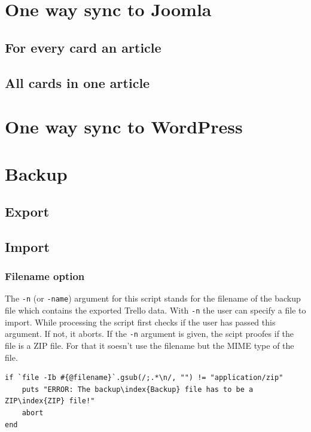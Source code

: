 \section{One way sync to Joomla}

\subsection{For every card an article}

\subsection{All cards in one article}

\section{One way sync to WordPress}

\section{Backup}

\subsection{Export}

\subsection{Import}

\subsubsection{Filename option}
The \texttt{-n} (or \texttt{-name}) argument for this script stands for the filename of the backup file which contains the  exported Trello data. With \texttt{-n} the user can specify a file to import. While processing the script first checks if the user has passed this argument. If not, it aborts. If the \texttt{-n} argument is given, the scipt proofes if the file is a ZIP file. For that it soesn't use the filename but the MIME type of the file.

\begin{lstlisting}[float=htb, caption=Checking if the file has the MIME type \textquotedblleft application/zip\textquotedblright, label=listing008]
if `file -Ib #{@filename}`.gsub(/;.*\n/, "") != "application/zip"
	puts "ERROR: The backup\index{Backup} file has to be a ZIP\index{ZIP} file!"
	abort
end
\end{lstlisting}

